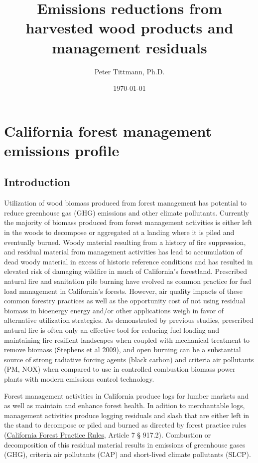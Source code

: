 \documentclass[a4paper]{article}
\author{Peter Tittmann, Ph.D.}
\date{\today}
\title{Emissions reductions from harvested wood products and management residuals}
\begin{document}
\maketitle
\tableofcontents

\pagebreak
\section{California forest management emissions profile}
\label{sec:orgheadline15}
\subsection{Introduction}
\label{sec:orgheadline2}

Utilization of wood biomass produced from forest management has
potential to reduce greenhouse gas (GHG) emissions and other climate
pollutants.  Currently the majority of biomass produced from forest
management activities is either left in the woods to decompose or
aggregated at a landing where it is piled and eventually burned. Woody
material resulting from a history of fire suppression, and residual
material from management activities has lead to accumulation of dead
woody material in excess of historic reference conditions and has
resulted in elevated risk of damaging wildfire in much of California's
forestland.  Prescribed natural fire and sanitation pile burning have
evolved as common practice for fuel load management in California’s
forests. However, air quality impacts of these common forestry practices as well as the opportunity cost of not using residual biomass in bioenergy energy and/or other applications weigh in favor of alternative utilization strategies. As demonstrated by  previous studies, prescribed natural fire is often only an effective tool for reducing fuel loading and maintaining fire-resilient landscapes when coupled with mechanical treatment to remove biomass (Stephens et al 2009), and open burning can be a substantial source of strong radiative forcing agents (black carbon) and criteria air pollutants (PM, NOX) when compared to use in controlled combustion biomass power plants with modern emissions control technology.

Forest management activities in California produce logs for
lumber markets and as well as maintain and enhance forest health.
In adition to merchantable logs, management activities produce logging residuals and slash that are either left
in the stand to decompose or piled and burned as directed by forest
practice rules (\href{http://calfire.ca.gov/resource_mgt/downloads/2013_FP_Rulebook_with_Tech_RuleNo1.pdf}{California Forest Practice Rules}, Article 7 §
917.2). Combustion or decomposition of this residual material results
in emissions of greenhouse gases (GHG), criteria air pollutants (CAP) and
short-lived climate pollutants (SLCP).
\end{document}
